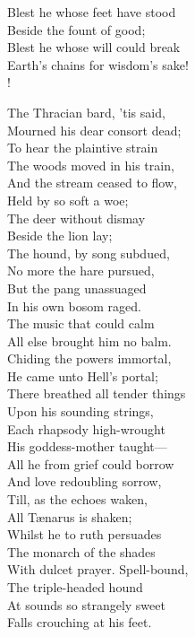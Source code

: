 \documentclass[12pt]{book}
\newenvironment{ipoem}[1]%
  {\setcounter{poemindentevery}{#1}\begin{poem}\small}%
  {\end{poem}\setcounter{poemindentevery}{0}}
\begin{document}
\begin{ipoem}{0}
    Blest he whose feet have stood \\
    Beside the fount of good; \\
    Blest he whose will could break \\
    Earth's chains for wisdom's sake! \\!

    The Thracian bard, 'tis said, \\
    Mourned his dear consort dead; \\
    To hear the plaintive strain \\
    The woods moved in his train, \\
    And the stream ceased to flow, \\
    Held by so soft a woe; \\
    The deer without dismay \\
    Beside the lion lay; \\
    The hound, by song subdued, \\
    No more the hare pursued, \\
    But the pang unassuaged \\
    In his own bosom raged. \\
    The music that could calm \\
    All else brought him no balm. \\
    Chiding the powers immortal, \\
    He came unto Hell's portal; \\
    There breathed all tender things \\
    Upon his sounding strings, \\
    Each rhapsody high-wrought \\
    His goddess-mother taught--- \\
    All he from grief could borrow \\
    And love redoubling sorrow, \\
    Till, as the echoes waken, \\
    All Tænarus is shaken; \\
    Whilst he to ruth persuades \\
    The monarch of the shades \\
    With dulcet prayer. Spell-bound, \\
    The triple-headed hound \\
    At sounds so strangely sweet \\
    Falls crouching at his feet. \\

\end{ipoem}
\end{document}
